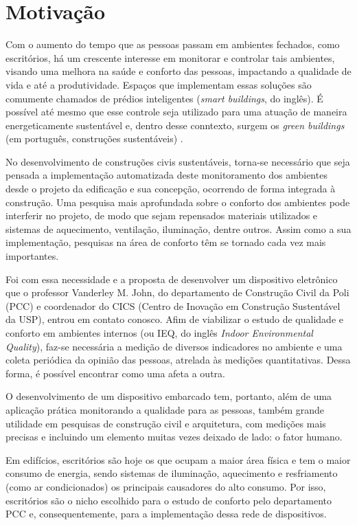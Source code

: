 \documentclass[../monografia.tex]{subfiles}
\begin{document}
\section{Motivação}

Com o aumento do tempo que as pessoas passam em ambientes fechados, como escritórios, há um crescente interesse em monitorar e controlar tais ambientes, visando uma melhora na saúde e conforto das pessoas, impactando a qualidade de vida e até a produtividade. Espaços que implementam essas soluções são comumente chamados de prédios inteligentes (\textit{smart buildings}, do inglês). É possível até mesmo que esse controle seja utilizado para uma atuação de maneira energeticamente sustentável e, dentro desse conntexto, surgem os \textit{green buildings} (em português, construções sustentáveis) \cite{GreenBuildings} \cite{EnergyBuildings}.

No desenvolvimento de construções civis sustentáveis, torna-se necessário que seja pensada a implementação automatizada deste monitoramento dos ambientes desde o projeto da edificação e sua concepção, ocorrendo de forma integrada à construção. Uma pesquisa mais aprofundada sobre o conforto dos ambientes pode interferir no projeto, de modo que sejam repensados materiais utilizados e sistemas de aquecimento, ventilação, iluminação, dentre outros. Assim como a sua implementação, pesquisas na área de conforto têm se tornado cada vez mais importantes. 

Foi com essa necessidade e a proposta de desenvolver um dispositivo eletrônico que o professor Vanderley M. John, do departamento de Construção Civil da Poli (PCC) e coordenador do CICS (Centro de Inovação em Construção Sustentável da USP)\cite{CICS}, entrou em contato conosco. Afim de viabilizar o estudo de qualidade e conforto em ambientes internos (ou IEQ, do inglês \textit{Indoor Environmental Quality}), faz-se necessária a medição de diversos indicadores no ambiente e uma coleta periódica da opinião das pessoas, atrelada às medições quantitativas. Dessa forma, é possível encontrar como uma afeta a outra. 

O desenvolvimento de um dispositivo embarcado tem, portanto, além de uma aplicação prática monitorando a qualidade para as pessoas, também grande utilidade em pesquisas de construção civil e arquitetura, com medições mais precisas e incluindo um elemento muitas vezes deixado de lado: o fator humano.

Em edifícios, escritórios são hoje os que ocupam a maior área física e tem o maior consumo de energia, sendo sistemas de iluminação, aquecimento e resfriamento (como ar condicionados) os principais causadores do alto consumo\cite{EnergyBuildings}. Por isso, escritórios são o nicho escolhido para o estudo de conforto pelo departamento PCC e, consequentemente, para a implementação dessa rede de dispositivos. 
\end{document}
